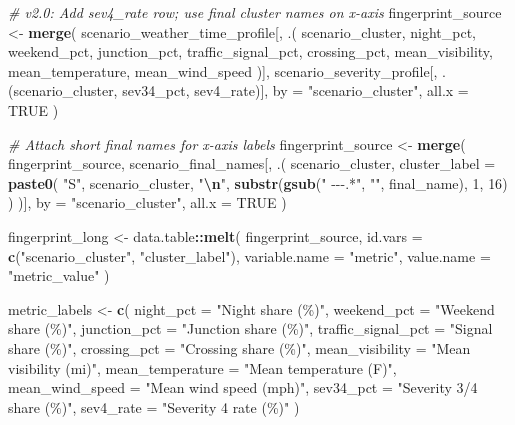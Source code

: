 \documentclass[
]{article}
\newenvironment{Shaded}{\begin{snugshade}}{\end{snugshade}}
\newcommand{\AttributeTok}[1]{\textcolor[rgb]{0.13,0.29,0.53}{#1}}
\newcommand{\CommentTok}[1]{\textcolor[rgb]{0.56,0.35,0.01}{\textit{#1}}}
\newcommand{\ConstantTok}[1]{\textcolor[rgb]{0.56,0.35,0.01}{#1}}
\newcommand{\DecValTok}[1]{\textcolor[rgb]{0.00,0.00,0.81}{#1}}
\newcommand{\FunctionTok}[1]{\textcolor[rgb]{0.13,0.29,0.53}{\textbf{#1}}}
\newcommand{\NormalTok}[1]{#1}
\newcommand{\OtherTok}[1]{\textcolor[rgb]{0.56,0.35,0.01}{#1}}
\newcommand{\SpecialCharTok}[1]{\textcolor[rgb]{0.81,0.36,0.00}{\textbf{#1}}}
\newcommand{\StringTok}[1]{\textcolor[rgb]{0.31,0.60,0.02}{#1}}
\begin{document}
\begin{Shaded}
\begin{Highlighting}[]
\CommentTok{\# v2.0: Add sev4\_rate row; use final cluster names on x{-}axis}
\NormalTok{fingerprint\_source }\OtherTok{\textless{}{-}} \FunctionTok{merge}\NormalTok{(}
\NormalTok{  scenario\_weather\_time\_profile[, .(}
\NormalTok{    scenario\_cluster, night\_pct, weekend\_pct,}
\NormalTok{    junction\_pct, traffic\_signal\_pct, crossing\_pct,}
\NormalTok{    mean\_visibility, mean\_temperature, mean\_wind\_speed}
\NormalTok{  )],}
\NormalTok{  scenario\_severity\_profile[, .(scenario\_cluster, sev34\_pct, sev4\_rate)],}
  \AttributeTok{by =} \StringTok{"scenario\_cluster"}\NormalTok{, }\AttributeTok{all.x =} \ConstantTok{TRUE}
\NormalTok{)}

\CommentTok{\# Attach short final names for x{-}axis labels}
\NormalTok{fingerprint\_source }\OtherTok{\textless{}{-}} \FunctionTok{merge}\NormalTok{(}
\NormalTok{  fingerprint\_source,}
\NormalTok{  scenario\_final\_names[, .(}
\NormalTok{    scenario\_cluster,}
    \AttributeTok{cluster\_label =} \FunctionTok{paste0}\NormalTok{(}
      \StringTok{"S"}\NormalTok{, scenario\_cluster, }\StringTok{"}\SpecialCharTok{\textbackslash{}n}\StringTok{"}\NormalTok{,}
      \FunctionTok{substr}\NormalTok{(}\FunctionTok{gsub}\NormalTok{(}\StringTok{" {-}{-}{-}.*"}\NormalTok{, }\StringTok{""}\NormalTok{, final\_name), }\DecValTok{1}\NormalTok{, }\DecValTok{16}\NormalTok{)}
\NormalTok{    )}
\NormalTok{  )],}
  \AttributeTok{by =} \StringTok{"scenario\_cluster"}\NormalTok{, }\AttributeTok{all.x =} \ConstantTok{TRUE}
\NormalTok{)}

\NormalTok{fingerprint\_long }\OtherTok{\textless{}{-}}\NormalTok{ data.table}\SpecialCharTok{::}\FunctionTok{melt}\NormalTok{(}
\NormalTok{  fingerprint\_source,}
  \AttributeTok{id.vars       =} \FunctionTok{c}\NormalTok{(}\StringTok{"scenario\_cluster"}\NormalTok{, }\StringTok{"cluster\_label"}\NormalTok{),}
  \AttributeTok{variable.name =} \StringTok{"metric"}\NormalTok{,}
  \AttributeTok{value.name    =} \StringTok{"metric\_value"}
\NormalTok{)}

\NormalTok{metric\_labels }\OtherTok{\textless{}{-}} \FunctionTok{c}\NormalTok{(}
  \AttributeTok{night\_pct          =} \StringTok{"Night share (\%)"}\NormalTok{,}
  \AttributeTok{weekend\_pct        =} \StringTok{"Weekend share (\%)"}\NormalTok{,}
  \AttributeTok{junction\_pct       =} \StringTok{"Junction share (\%)"}\NormalTok{,}
  \AttributeTok{traffic\_signal\_pct =} \StringTok{"Signal share (\%)"}\NormalTok{,}
  \AttributeTok{crossing\_pct       =} \StringTok{"Crossing share (\%)"}\NormalTok{,}
  \AttributeTok{mean\_visibility    =} \StringTok{"Mean visibility (mi)"}\NormalTok{,}
  \AttributeTok{mean\_temperature   =} \StringTok{"Mean temperature (F)"}\NormalTok{,}
  \AttributeTok{mean\_wind\_speed    =} \StringTok{"Mean wind speed (mph)"}\NormalTok{,}
  \AttributeTok{sev34\_pct          =} \StringTok{"Severity 3/4 share (\%)"}\NormalTok{,}
  \AttributeTok{sev4\_rate          =} \StringTok{"Severity 4 rate (\%)"}
\NormalTok{)}


\end{Highlighting}
\end{Shaded}
\end{document}
